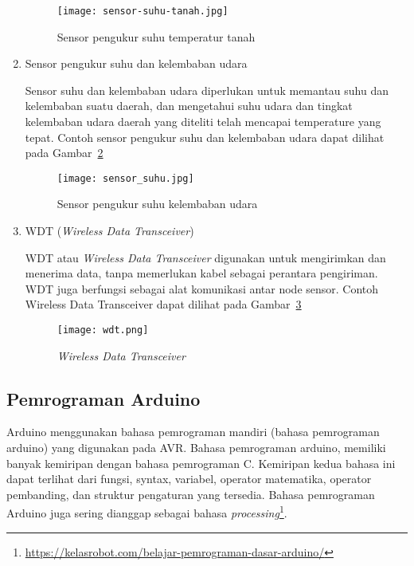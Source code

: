 \begin{enumerate}
     \begin{figure}[H]
    	\centering  
    	\texttt{[image: sensor-suhu-tanah.jpg]}  
    	\caption[Sensor pengukur suhu temperatur tanah]{Sensor pengukur suhu temperatur tanah} 
    	\label{fig:Sensor pengukur suhu temperatur tanah} 
    \end{figure}
    
    \item Sensor pengukur suhu dan kelembaban udara 

     Sensor suhu dan kelembaban udara diperlukan untuk memantau suhu dan kelembaban suatu daerah, dan mengetahui suhu udara dan tingkat kelembaban udara daerah yang diteliti telah mencapai temperature yang tepat.
     Contoh sensor pengukur suhu dan kelembaban udara dapat dilihat pada Gambar~\ref{fig:Sensor pengukur suhu kelembaban udara}
     
     \begin{figure}[H]
    	\centering  
    	\texttt{[image: sensor\_suhu.jpg]}  
    	\caption[Sensor pengukur suhu kelembaban udara]{Sensor pengukur suhu kelembaban udara} 
    	\label{fig:Sensor pengukur suhu kelembaban udara} 
    \end{figure}
     
     \item WDT (\textit{Wireless Data Transceiver})
     
     WDT atau \textit{Wireless Data Transceiver} digunakan untuk mengirimkan dan menerima data, tanpa memerlukan kabel sebagai perantara pengiriman. WDT juga berfungsi sebagai alat komunikasi antar node sensor. Contoh Wireless Data Transceiver dapat dilihat pada Gambar~\ref{fig:Wireless Data Transceiver}
     
     \begin{figure}[H]
    	\centering  
    	\texttt{[image: wdt.png]}  
    	\caption[\textit{Wireless Data Transceiver}]{\textit{Wireless Data Transceiver}} 
    	\label{fig:Wireless Data Transceiver} 
    \end{figure}
\end{enumerate}



\subsection{Pemrograman Arduino} \label{Pemrograman Arduino}
Arduino menggunakan bahasa pemrograman mandiri (bahasa pemrograman arduino) yang digunakan pada AVR. Bahasa pemrograman arduino, memiliki banyak kemiripan dengan bahasa pemrograman C. Kemiripan kedua bahasa ini dapat terlihat dari fungsi, syntax, variabel, operator matematika, operator pembanding, dan struktur pengaturan yang tersedia. Bahasa pemrograman Arduino juga sering dianggap sebagai bahasa \textit{processing}\footnote{\url{https://kelasrobot.com/belajar-pemrograman-dasar-arduino/}}.

